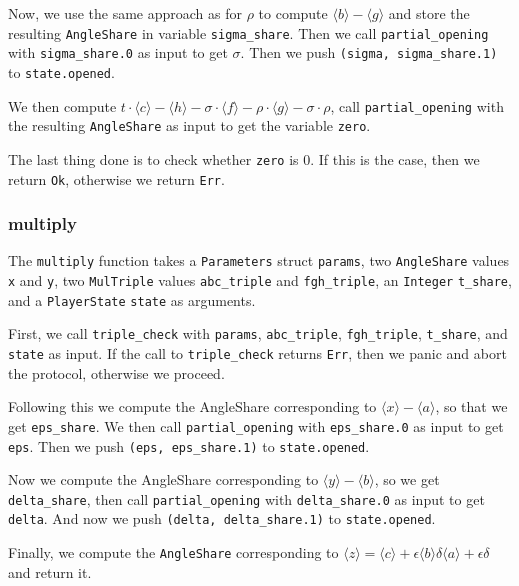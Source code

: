 \documentclass[../main.tex]{subfiles}
\begin{document}
Now, we use the same approach as for $\rho$ to compute $\langle b \rangle - \langle g \rangle$ and store the resulting \lstinline{AngleShare} in variable \lstinline{sigma_share}. Then we call \lstinline{partial_opening} with \lstinline{sigma_share.0} as input to get $\sigma$. Then we push \lstinline{(sigma, sigma_share.1)} to \lstinline{state.opened}.

We then compute $t \cdot \langle c \rangle - \langle h \rangle - \sigma \cdot \langle f \rangle - \rho \cdot \langle g \rangle - \sigma \cdot \rho$, call \lstinline{partial_opening} with the resulting \lstinline{AngleShare} as input to get the variable \lstinline{zero}.

The last thing done is to check whether \lstinline{zero} is $0$. If this is the case, then we return \lstinline{Ok}, otherwise we return \lstinline{Err}.

\subsubsection{multiply}
The \lstinline{multiply} function takes a \lstinline{Parameters} struct \lstinline{params}, two \lstinline{AngleShare} values \lstinline{x} and \lstinline{y}, two \lstinline{MulTriple} values \lstinline{abc_triple} and \lstinline{fgh_triple}, an \lstinline{Integer} \lstinline{t_share}, and a \lstinline{PlayerState} \lstinline{state} as arguments.

First, we call \lstinline{triple_check} with \lstinline{params}, \lstinline{abc_triple}, \lstinline{fgh_triple}, \lstinline{t_share}, and \lstinline{state} as input. If the call to \lstinline{triple_check} returns \lstinline{Err}, then we panic and abort the protocol, otherwise we proceed.

Following this we compute the AngleShare corresponding to $\langle x \rangle - \langle a \rangle$, so that we get \lstinline{eps_share}. We then call \lstinline{partial_opening} with \lstinline{eps_share.0} as input to get \lstinline{eps}. Then we push \lstinline{(eps, eps_share.1)} to \lstinline{state.opened}.

Now we compute the AngleShare corresponding to $\langle y \rangle - \langle b \rangle$, so we get \lstinline{delta_share}, then call \lstinline{partial_opening} with \lstinline{delta_share.0} as input to get \lstinline{delta}. And now we push \lstinline{(delta, delta_share.1)} to \lstinline{state.opened}.

Finally, we compute the \lstinline{AngleShare} corresponding to $\langle z \rangle = \langle c \rangle + \epsilon \langle b \rangle \delta \langle a \rangle + \epsilon \delta$ and return it.
\end{document}
